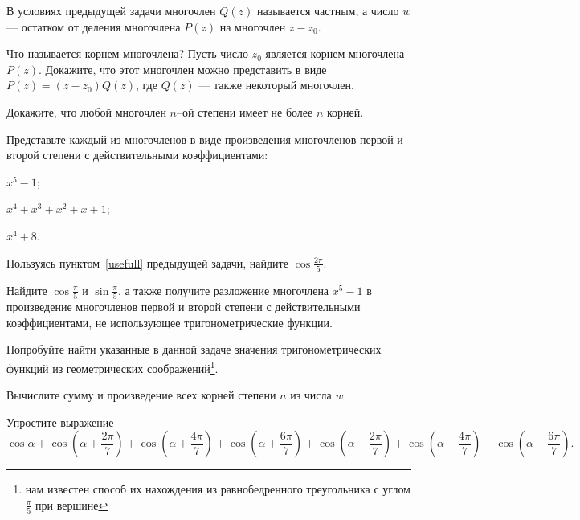 \documentclass[a4paper, 12pt, num=22]{listok}
\begin{document}
\begin{definition}
	В условиях предыдущей задачи многочлен $Q(z)$ называется частным,
	а число $w$ --- остатком от деления многочлена $P(z)$ на многочлен $z - z_0$.
\end{definition}
\begin{problem}
	Что называется корнем многочлена?
	Пусть число $z_0$ является корнем многочлена $P(z)$.
	Докажите, что этот многочлен можно представить в виде $P(z) = (z - z_0)Q(z)$,
	где $Q(z)$ --- также некоторый многочлен.
\end{problem}
\begin{problem}
	Докажите, что любой многочлен $n$--ой степени имеет не более $n$ корней.
\end{problem}
\begin{problem}
	Представьте каждый из многочленов в виде произведения многочленов первой и второй степени с действительными коэффициентами:
	\begin{multienum}{3}
		\item\label{usefull} $x^5 - 1$;
		\item $x^4 + x^3 + x^2 + x + 1$;
		\item $x^4 + 8$.
	\end{multienum}
\end{problem}
\begin{problem}
\begin{probparts}
	\item Пользуясь пунктом~\ref{usefull} предыдущей задачи, найдите $\cos{\frac{2\pi}5}$.
	\item Найдите $\cos{\frac \pi 5}$ и $\sin{\frac \pi 5}$,
	а также получите разложение многочлена $x^5 - 1$ в произведение многочленов первой и
	второй степени с действительными коэффициентами, не использующее тригонометрические функции.
	\item Попробуйте найти указанные в данной задаче значения тригонометрических функций
	из геометрических соображений\footnote{нам известен способ их нахождения из равнобедренного треугольника с углом $\frac \pi 5$ при вершине}.
\end{probparts}
\end{problem}
\begin{problem}
\begin{probenum}
	\item Вычислите сумму и произведение всех корней степени $n$ из числа $w$.
	\item Упростите выражение
	\[
		\cos \alpha
		+ \cos{(\alpha + \frac{2\pi}7)} + \cos{(\alpha + \frac{4\pi}7)} + \cos{(\alpha + \frac{6\pi}7)}
		+ \cos{(\alpha - \frac{2\pi}7)} + \cos{(\alpha - \frac{4\pi}7)} + \cos{(\alpha - \frac{6\pi}7)}.
	\]
\end{probenum}
\end{problem}
\end{document}
